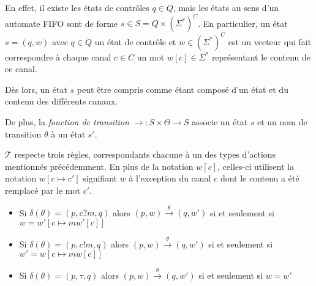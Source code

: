 En effet, il existe les états de contrôles $q\in Q$, mais les états au sens d'un automate FIFO sont de forme $s \in S=Q\times(\Sigma^*)^C$. En particulier, un état $s=(q,w)$ avec $q\in Q$ un état de contrôle et $w\in (\Sigma^*)^C$ est un vecteur qui fait correspondre à chaque canal $c\in C$ un mot $w[c] \in \Sigma^*$ représentant le contenu de ce canal.

Dès lors, un état $s$ peut être compris comme étant composé d'un état et du contenu des différents canaux.

De plus, la \emph{fonction de transition} $\rightarrow:S\times\Theta\rightarrow S$ associe un état $s$ et un nom de transition $\theta$ à un état $s'$.

$\mathcal{T}$ respecte trois règles, correspondants chacune à un des types d'actions mentionnés précédemment. En plus de la notation $w[c]$, celles-ci utilisent la notation $w[c\mapsto c']$ signifiant $w$ à l'exception du canal $c$ dont le contenu a été remplacé par le mot $c'$.
\begin{itemize}
  \item Si $\delta(\theta)=(p,c?m,q)$ alors $(p,w)\xrightarrow{\theta}(q,w')$ si et seulement si $w=w'[c\mapsto mw'[c]]$
  \item Si $\delta(\theta)=(p,c!m,q)$ alors $(p,w)\xrightarrow{\theta}(q,w')$ si et seulement si $w'=w[c\mapsto mw[c]]$
  \item Si $\delta(\theta)=(p,\tau,q)$ alors $(p,w)\xrightarrow{\theta}(q,w')$ si et seulement si $w=w'$
\end{itemize}




